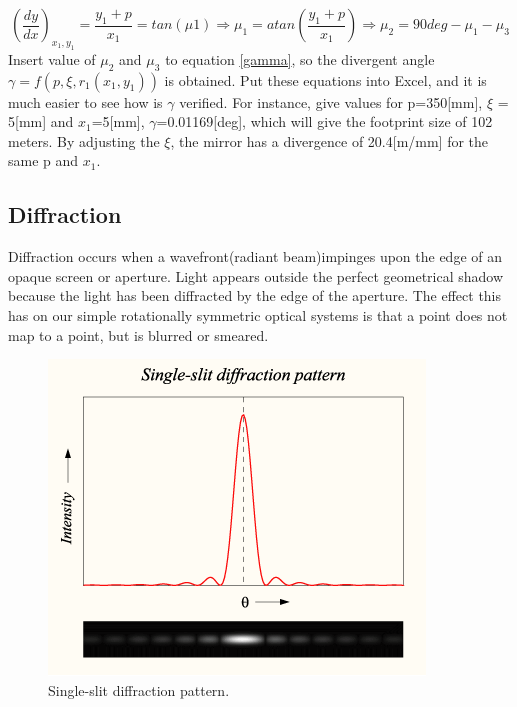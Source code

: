 \begin{equation}
\label{miu2}
(\frac{dy}{dx})_{x_{1},y_{1}} = \frac{y_{1}+p}{x_{1}} = tan(\mu{1})\Rightarrow \mu_{1} = atan(\frac{y_{1}+p}{x_{1}}) \Rightarrow \mu_{2} = 90deg - \mu_{1} - \mu_{3}
\end {equation}
Insert value of $\mu_{2}$ and $\mu_{3}$ to equation \ref{gamma}, so the divergent angle $\gamma = f(p, \xi, r_{1}(x_{1}, y_{1}))$ is obtained. Put these equations into Excel, and it is much easier to see how is $\gamma$ verified. For instance, give values for p=350[mm], $\xi$ = 5[mm] and $x_{1}$=5[mm], $\gamma$=0.01169[deg], which will give the footprint size of 102 meters. By adjusting the $\xi$, the mirror has a divergence of 20.4[m/mm] for the same p and $x_{1}$.

\subsection{Diffraction}
\label{diff}
Diffraction occurs when a wavefront(radiant beam)impinges upon the edge of an opaque screen or aperture. Light appears outside the perfect geometrical shadow because the light has been diffracted by the edge of the aperture. The effect this has on our simple rotationally symmetric optical systems is that a point does not map to a point, but is blurred or smeared.\cite{prism_book} 

\begin{figure}[ht!]
\centering
\includegraphics[scale = 0.8]{chapters/img/diffraction_singleslit.png}
\caption{Single-slit diffraction pattern.}
\label{fig:single_slit}
\end{figure}

